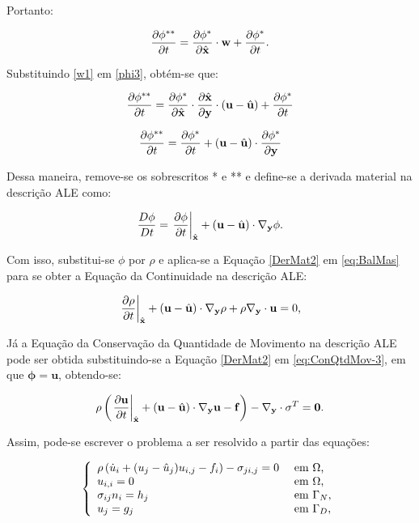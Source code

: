 \noindent Portanto:

\begin{equation}
    \frac{\partial{\phi^{**}}}{\partial{t}}=\frac{\partial{\phi^{*}}}{\partial{\hat{\mathbf{x}}}}\cdot\mathbf{w}+\frac{\partial{\phi^{*}}}{\partial{t}}\text{.}
    \label{phi3}
\end{equation}

Substituindo \ref{w1} em \ref{phi3}, obtém-se que:

\[\frac{\partial{\phi^{**}}}{\partial{t}}=\frac{\partial{\phi^{*}}}{\partial{\hat{\mathbf{x}}}}\cdot\frac{\partial{\hat{\mathbf{x}}}}{\partial{\mathbf{y}}}\cdot(\mathbf{u}-\hat{\mathbf{u}})+\frac{\partial{\phi^{*}}}{\partial{t}}\]

\[\frac{\partial{\phi^{**}}}{\partial{t}}=\frac{\partial{\phi^{*}}}{\partial{t}}+(\mathbf{u}-\hat{\mathbf{u}})\cdot\frac{\partial{\phi^{*}}}{\partial{\mathbf{y}}}\]

Dessa maneira, remove-se os sobrescritos * e ** e define-se a derivada material na descrição ALE como:

\begin{equation}
    \frac{D\phi}{Dt}=\left.\frac{\partial{\phi}}{\partial{t}}\right|_{\hat{\mathbf{x}}}+(\mathbf{u}-\hat{\mathbf{u}})\cdot\mathbf{\nabla_y}\phi\text{.}\label{DerMat2}
\end{equation}

Com isso, substitui-se $\phi$ por $\rho$ e aplica-se a Equação \ref{DerMat2} em \ref{eq:BalMas} para se obter a Equação da Continuidade na descrição ALE:

\begin{equation}
    \left.\frac{\partial{\rho}}{\partial{t}}\right|_{\hat{\mathbf{x}}}+(\mathbf{u}-\hat{\mathbf{u}})\cdot\mathbf{\nabla_y}\rho+\rho\mathbf{\nabla_y}\cdot\mathbf{u}=0\text{,}
    \label{ConMas4}
\end{equation}

Já a Equação da Conservação da Quantidade de Movimento na descrição ALE pode ser obtida substituindo-se a Equação \ref{DerMat2} em \ref{eq:ConQtdMov-3}, em que $\mathbf{\phi}=\mathbf{u}$, obtendo-se:

\begin{equation}
    \rho\left(\left.\frac{\partial{\mathbf{u}}}{\partial{t}}\right|_{\hat{\mathbf{x}}}+(\mathbf{u}-\hat{\mathbf{u}})\cdot\mathbf{\nabla_y}\mathbf{u}-\mathbf{f}\right)-\mathbf{\nabla_y}\cdot\mathbf{\sigma}^T=\mathbf{0}\text{.}
    \label{ConQtdMov10}
\end{equation}

Assim, pode-se escrever o problema a ser resolvido a partir das equações:

\begin{equation}
    \left\{
    \begin{array}{ll}
        \rho\left({\dot{u}_i+(u_j-\hat{u}_j)u_{i,j}-f_i}\right)-\sigma_{ji,j}=0 & \text{ em }\Omega\text{,}   \\
        u_{i,i}=0                                                         & \text{ em }\Omega\text{,}   \\
        \sigma_{ij}n_i=h_j                                                & \text{ em }\Gamma_N\text{,} \\
        u_j=g_j                                                           & \text{ em }\Gamma_D\text{,}
    \end{array}
    \right.\label{eq:NS-ALE}
\end{equation}

